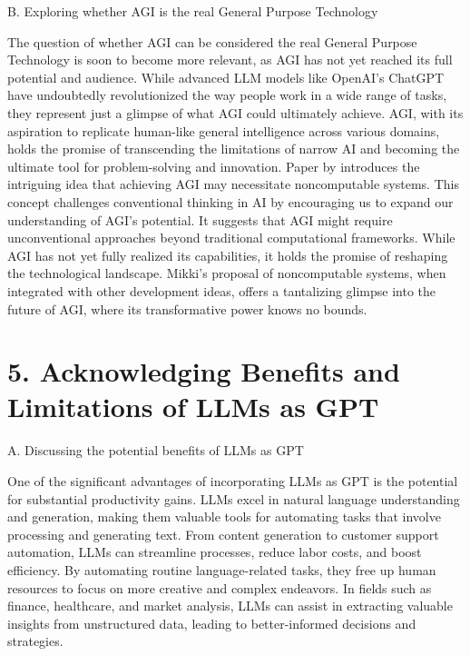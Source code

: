 \documentclass[preprint, 3p,
authoryear]{elsarticle} %
\begin{document}
B. Exploring whether AGI is the real General Purpose Technology

The question of whether AGI can be considered the real General Purpose
Technology is soon to become more relevant, as AGI has not yet reached
its full potential and audience. While advanced LLM models like OpenAI's
ChatGPT have undoubtedly revolutionized the way people work in a wide
range of tasks, they represent just a glimpse of what AGI could
ultimately achieve. AGI, with its aspiration to replicate human-like
general intelligence across various domains, holds the promise of
transcending the limitations of narrow AI and becoming the ultimate tool
for problem-solving and innovation. Paper by
\citep{Mikki2023ArtificialGI} introduces the intriguing idea that
achieving AGI may necessitate noncomputable systems. This concept
challenges conventional thinking in AI by encouraging us to expand our
understanding of AGI's potential. It suggests that AGI might require
unconventional approaches beyond traditional computational frameworks.
While AGI has not yet fully realized its capabilities, it holds the
promise of reshaping the technological landscape. Mikki's proposal of
noncomputable systems, when integrated with other development ideas,
offers a tantalizing glimpse into the future of AGI, where its
transformative power knows no bounds.

\hypertarget{acknowledging-benefits-and-limitations-of-llms-as-gpt}{%
\section{5. Acknowledging Benefits and Limitations of LLMs as
GPT}\label{acknowledging-benefits-and-limitations-of-llms-as-gpt}}

A. Discussing the potential benefits of LLMs as GPT

One of the significant advantages of incorporating LLMs as GPT is the
potential for substantial productivity gains. LLMs excel in natural
language understanding and generation, making them valuable tools for
automating tasks that involve processing and generating text. From
content generation to customer support automation, LLMs can streamline
processes, reduce labor costs, and boost efficiency. By automating
routine language-related tasks, they free up human resources to focus on
more creative and complex endeavors. In fields such as finance,
healthcare, and market analysis, LLMs can assist in extracting valuable
insights from unstructured data, leading to better-informed decisions
and strategies.
\end{document}
